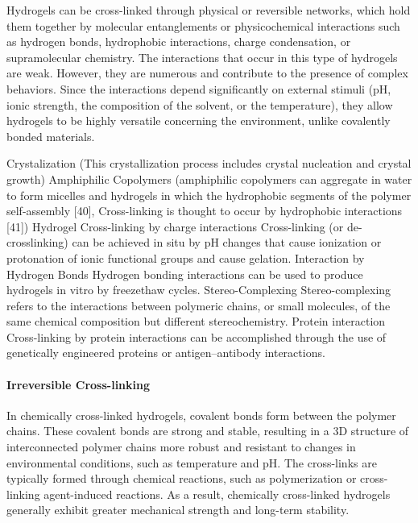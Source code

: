 Hydrogels can be cross-linked through physical or reversible networks, which hold them together by molecular entanglements or physicochemical interactions such as hydrogen bonds, hydrophobic interactions, charge condensation, or supramolecular chemistry\citep{bustamante-torresHydrogelsClassificationAccording2021}. 
The interactions that occur in this type of hydrogels are weak\citep{bustamante-torresHydrogelsClassificationAccording2021}. 
However, they are numerous and contribute to the presence of complex behaviors\citep{bustamante-torresHydrogelsClassificationAccording2021}. 
Since the interactions depend significantly on external stimuli (pH, ionic strength, the composition of the solvent, or the temperature), they allow hydrogels to be highly versatile concerning the environment, unlike covalently bonded materials\citep{bustamante-torresHydrogelsClassificationAccording2021}.


Crystalization 
    (This crystallization process includes crystal nucleation and crystal growth)
Amphiphilic Copolymers 
    (amphiphilic copolymers can aggregate in water to form micelles and hydrogels in which the hydrophobic segments of the polymer self-assembly [40]\citep{bustamante-torresHydrogelsClassificationAccording2021}, Cross-linking is thought to occur by hydrophobic interactions [41])
Hydrogel Cross-linking by charge interactions
    Cross-linking (or de-crosslinking) can be achieved in situ by pH changes that cause ionization or protonation of ionic functional groups and cause gelation\citep{bustamante-torresHydrogelsClassificationAccording2021}.
Interaction by Hydrogen Bonds
    Hydrogen bonding interactions can be used to produce hydrogels in vitro by freezethaw cycles. 
Stereo-Complexing
    Stereo-complexing refers to the interactions between polymeric chains, or small molecules, of the same chemical composition but different stereochemistry. 
Protein interaction
    Cross-linking by protein interactions can be accomplished through the use of genetically engineered proteins or antigen–antibody interactions\citep{bustamante-torresHydrogelsClassificationAccording2021}. 



\paragraph{Irreversible Cross-linking}\citep{priyaComprehensiveReviewHydrogel2024}
In chemically cross-linked hydrogels, covalent bonds form between the polymer chains.
These covalent bonds are strong and stable, resulting in a 3D structure of interconnected polymer chains more robust and resistant to changes in environmental conditions, such as temperature and pH. 
The cross-links are typically formed through chemical reactions, such as polymerization or cross-linking agent-induced reactions. 
As a result, chemically cross-linked hydrogels generally exhibit greater mechanical strength and long-term stability. 

